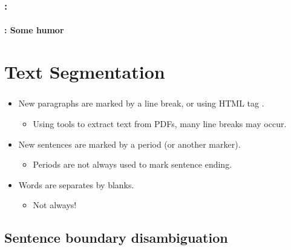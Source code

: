 \documentclass[xcolor=table]{beamer}
\begin{document}
\begin{frame}
	\frametitle{\insertshortsubtitle: \insertsection}
	\framesubtitle{\insertsubsection: Some humor}

	\begin{center}
	\end{center}

\end{frame}

\section{Text Segmentation}

\begin{frame}
	\frametitle{\insertshortsubtitle}
	\framesubtitle{\insertsection}

	\begin{itemize}
		\item New paragraphs are marked by a line break, or using HTML tag .
		\begin{itemize}
			\item Using tools to extract text from PDFs, many line breaks may occur. 
		\end{itemize}
		\item New sentences are marked by a period (or another marker).
		\begin{itemize}
			\item Periods are not always used to mark sentence ending.
		\end{itemize}
		\item Words are separates by blanks.
		\begin{itemize}
			\item Not always!
		\end{itemize}
	\end{itemize}

\end{frame}

\subsection{Sentence boundary disambiguation}
\end{document}
